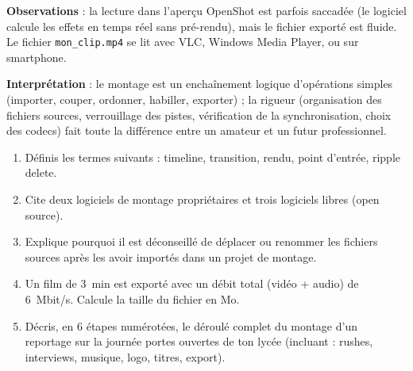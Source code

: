 \documentclass[11pt]{article}
\begin{document}
\begin{experience}
\textbf{Observations} : la lecture dans l'aperçu OpenShot est parfois saccadée (le logiciel calcule les effets en temps réel sans pré-rendu), mais le fichier exporté est fluide. Le fichier \texttt{mon\_clip.mp4} se lit avec VLC, Windows Media Player, ou sur smartphone.

\textbf{Interprétation} : le montage est un enchaînement logique d'opérations simples (importer, couper, ordonner, habiller, exporter) ; la rigueur (organisation des fichiers sources, verrouillage des pistes, vérification de la synchronisation, choix des codecs) fait toute la différence entre un amateur et un futur professionnel.
\end{experience}

\begin{exercice}
\begin{enumerate}
  \item Définis les termes suivants : timeline, transition, rendu, point d'entrée, ripple delete.
  \item Cite deux logiciels de montage propriétaires et trois logiciels libres (open source).
  \item Explique pourquoi il est déconseillé de déplacer ou renommer les fichiers sources après les avoir importés dans un projet de montage.
  \item Un film de \SI{3}{min} est exporté avec un débit total (vidéo + audio) de \SI{6}{Mbit/s}. Calcule la taille du fichier en Mo.
  \item Décris, en 6 étapes numérotées, le déroulé complet du montage d'un reportage sur la journée portes ouvertes de ton lycée (incluant : rushes, interviews, musique, logo, titres, export).
\end{enumerate}
\end{exercice}
\end{document}
